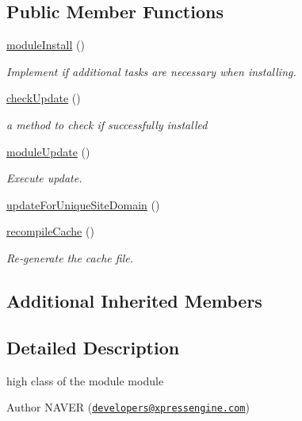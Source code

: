 \subsection*{Public Member Functions}
\begin{DoxyCompactItemize}
\item 
\hyperlink{classmodule_a7b8280dacfb107bdea9440e4a4cf42f0}{module\+Install} ()
\begin{DoxyCompactList}\small\item\em Implement if additional tasks are necessary when installing. \end{DoxyCompactList}\item 
\hyperlink{classmodule_a357cb59a36a3aa94003882c8256c038e}{check\+Update} ()
\begin{DoxyCompactList}\small\item\em a method to check if successfully installed \end{DoxyCompactList}\item 
\hyperlink{classmodule_aa71624e39c27ab5c362b8b1623b36ec4}{module\+Update} ()
\begin{DoxyCompactList}\small\item\em Execute update. \end{DoxyCompactList}\item 
\hyperlink{classmodule_a935bc2073b87fe979b8c1c7221174448}{update\+For\+Unique\+Site\+Domain} ()
\item 
\hyperlink{classmodule_ad7b18470ccd972960f4a5ce81c7760ce}{recompile\+Cache} ()
\begin{DoxyCompactList}\small\item\em Re-\/generate the cache file. \end{DoxyCompactList}\end{DoxyCompactItemize}
\subsection*{Additional Inherited Members}


\subsection{Detailed Description}
high class of the module module 

\begin{DoxyAuthor}{Author}
N\+A\+V\+ER (\href{mailto:developers@xpressengine.com}{\tt developers@xpressengine.\+com}) 
\end{DoxyAuthor}


